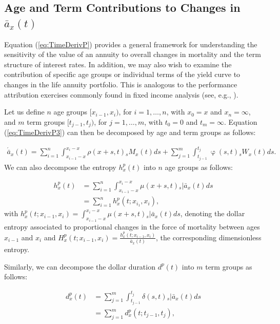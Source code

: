 \documentclass[12pt]{article}
\begin{document}
{\subsection{Age and Term Contributions to Changes in $\bar{a}_x(t)$}

 
 Equation (\ref{eq:TimeDerivP}) provides a general framework for understanding the sensitivity of the value of an annuity to overall changes in mortality and the term structure of interest rates. In addition, we may also wish to examine the contribution of specific age groups or individual terms of the yield curve to changes in the life annuity portfolio. This is analogous to the performance attribution exercises commonly found in fixed income analysis (see, e.g., \citet{Daul2012}).
 
 Let us define $n$ age groups $[x_{i-1}, x_i)$, for $i=1,\ldots,n$, with $x_0 = x$ and $x_n = \infty$, and $m$ term groups $[t_{j-1}, t_j)$, for $j=1,\ldots,m$, with $t_0 = 0$ and $t_m = \infty$. Equation (\ref{eq:TimeDerivP3}) can then be decomposed by age and term groups as follows:
 

\begin{equation}\label{eq:TimeDerivAge}
\begin{split}
 \acute{\bar{a}}_x(t) = \sum_{i=1}^n\int_{x_{i-1}-x}^{x_i-x}  \rho(x+s,t) {}_sM_x(t)  ds +\sum_{j=1}^m\int_{t_{j-1}}^{t_j}   \upvarphi(s,t) {}_sW_x(t)  ds.  
\end{split}
\end{equation}
We can also decompose the entropy $h_x^p(t)$ into $n$ age groups as follows:

\begin{equation} \label{eq:EntropyAge}
\begin{split}
{h}^{p}_{x}(t) &=  \sum_{i=1}^n\int_{x_{i-1}-x}^{x_i-x} \mu(x+s,t)   {}_s|\bar{a}_x(t) ds \\
&=  \sum_{i=1}^n {h}^{p}_{x}(t;x_{i_1},x_{i}),
\end{split}
\end{equation}
with ${h}^{p}_{x}(t;x_{i-1},x_{i})=\int_{x_{i-1}-x}^{x_i-x} \mu(x+s,t)   {}_s|\bar{a}_x(t) ds$, denoting the dollar entropy associated to proportional changes in the force of mortality between ages $x_{i-1}$ and $x_{i}$ and ${H}^{p}_{x}(t;x_{i-1},x_{i}) = \frac{{h}^{p}_{x}(t;x_{i-1},x_{i})}{\bar{a}_x(t)}$, the corresponding dimensionless entropy. 

Similarly, we can decompose the dollar duration $d^p(t)$ into $m$ term groups as follows:

\begin{equation}\label{eq:DurationAge}
\begin{split}
{d}^{p}_{x}(t) &= \sum_{j=1}^m\int_{t_{j-1}}^{t_j} \delta(s,t) {}_s|\bar{a}_x(t)ds \\
&= \sum_{j=1}^m {d}^{p}_{x}(t;t_{j-1},t_{j}),
\end{split}
\end{equation}


}
\end{document}
